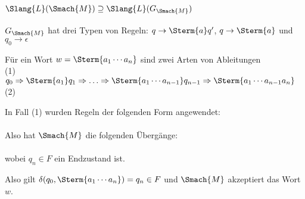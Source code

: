 \documentclass[aspectratio=1610,onlymath]{beamer}
\begin{document}
\begin{frame}[t]\frametitle{$\Slang{L}(\Smach{M})\supseteq\Slang{L}(G_{\Smach{M}})$}

$G_{\Smach{M}}$ hat drei Typen von Regeln: $q\to \Sterm{a}q'$, $q\to \Sterm{a}$ und $q_0\to \epsilon$
\\[1ex]\pause

Für ein Wort $w=\Sterm{a_1\cdots a_n}$ sind \alert{zwei} Arten von Ableitungen 
\\[1ex]

(1) $q_0\Rightarrow \Sterm{a_1}q_1 \Rightarrow \ldots \Rightarrow\Sterm{a_1\cdots a_{n-1}}q_{n-1}\Rightarrow \Sterm{a_1\cdots a_{n-1}a_n}$\\[1ex]
(2) 
\bigskip\pause


In Fall (1) wurden Regeln der folgenden Form angewendet:\\[1ex]
\\[1ex]
Also hat $\Smach{M}$ die folgenden Übergänge: \\[1ex]
\\[1ex]
wobei $q_n\in F$ ein Endzustand ist.
\bigskip\pause

Also gilt $\delta(q_0,\Sterm{a_1\cdots a_n})=q_n\in F$ und $\Smach{M}$ akzeptiert das Wort $w$.

\end{frame}
\end{document}
